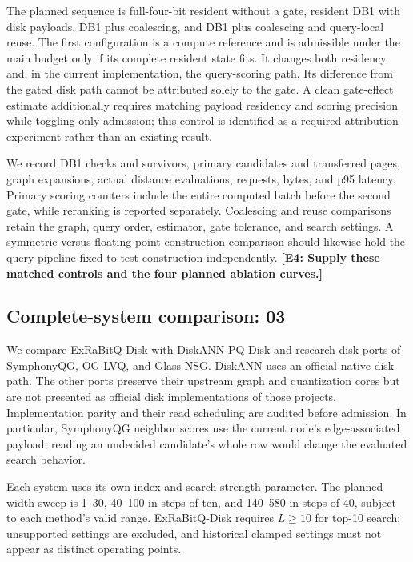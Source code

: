 The planned sequence is full-four-bit resident without a gate, resident DB1 with disk payloads, DB1 plus coalescing, and DB1 plus coalescing and query-local reuse. The first configuration is a compute reference and is admissible under the main budget only if its complete resident state fits. It changes both residency and, in the current implementation, the query-scoring path. Its difference from the gated disk path cannot be attributed solely to the gate. A clean gate-effect estimate additionally requires matching payload residency and scoring precision while toggling only admission; this control is identified as a required attribution experiment rather than an existing result.

We record DB1 checks and survivors, primary candidates and transferred pages, graph expansions, actual distance evaluations, requests, bytes, and p95 latency. Primary scoring counters include the entire computed batch before the second gate, while reranking is reported separately. Coalescing and reuse comparisons retain the graph, query order, estimator, gate tolerance, and search settings. A symmetric-versus-floating-point construction comparison should likewise hold the query pipeline fixed to test construction independently. \textbf{[E4: Supply these matched controls and the four planned ablation curves.]}

\subsection{Complete-system comparison: 03}

We compare ExRaBitQ-Disk with DiskANN-PQ-Disk and research disk ports of SymphonyQG, OG-LVQ, and Glass-NSG. DiskANN uses an official native disk path. The other ports preserve their upstream graph and quantization cores but are not presented as official disk implementations of those projects. Implementation parity and their read scheduling are audited before admission. In particular, SymphonyQG neighbor scores use the current node's edge-associated payload; reading an undecided candidate's whole row would change the evaluated search behavior.

Each system uses its own index and search-strength parameter. The planned width sweep is 1--30, 40--100 in steps of ten, and 140--580 in steps of 40, subject to each method's valid range. ExRaBitQ-Disk requires $L\geq10$ for top-10 search; unsupported settings are excluded, and historical clamped settings must not appear as distinct operating points.

